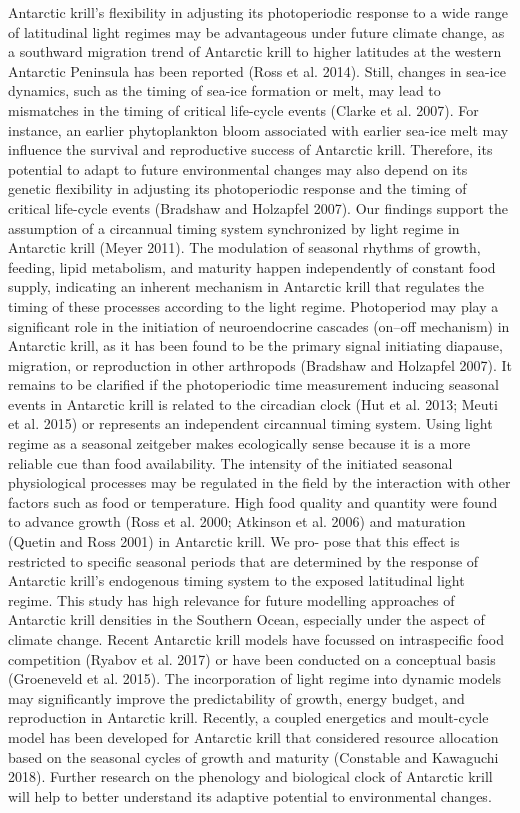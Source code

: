 Antarctic krill’s flexibility in adjusting its photoperiodic response to a wide range of latitudinal light regimes may be advantageous under future climate change, as a southward migration trend of Antarctic krill to higher latitudes at the western Antarctic Peninsula has been reported (Ross et al. 2014). Still, changes in sea-ice dynamics, such as the timing of sea-ice formation or melt, may lead to mismatches in the timing of critical life-cycle events (Clarke et al. 2007). For instance, an earlier phytoplankton bloom associated with earlier sea-ice melt may influence the survival and reproductive success of Antarctic krill. Therefore, its potential to adapt to future environmental changes may also depend on its genetic flexibility in adjusting its photoperiodic response and the timing of critical life-cycle events (Bradshaw and Holzapfel 2007). 
Our findings support the assumption of a circannual timing system synchronized by light regime in Antarctic krill (Meyer 2011). The modulation of seasonal rhythms of growth, feeding, lipid metabolism, and maturity happen independently of constant food supply, indicating an inherent mechanism in Antarctic krill that regulates the timing of these processes according to the light regime. Photoperiod may play a significant role in the initiation of neuroendocrine cascades (on–off mechanism) in Antarctic krill, as it has been found to be the primary signal initiating diapause, migration, or reproduction in other arthropods (Bradshaw and Holzapfel 2007). It remains to be clarified if the photoperiodic time measurement inducing seasonal events in Antarctic krill is related to the circadian clock (Hut et al. 2013; Meuti et al. 2015) or represents an independent circannual timing system. Using light regime as a seasonal zeitgeber makes ecologically sense because it is a more reliable cue than food availability. The intensity of the initiated seasonal physiological processes may be regulated in the field by the interaction with other factors such as food or temperature. High food quality and quantity were found to advance growth (Ross et al. 2000; Atkinson et al. 2006) and maturation (Quetin and Ross 2001) in Antarctic krill. We pro- pose that this effect is restricted to specific seasonal periods that are determined by the response of Antarctic krill’s endogenous timing system to the exposed latitudinal light regime. 
This study has high relevance for future modelling approaches of Antarctic krill densities in the Southern Ocean, especially under the aspect of climate change. Recent Antarctic krill models have focussed on intraspecific food competition (Ryabov et al. 2017) or have been conducted on a conceptual basis (Groeneveld et al. 2015). The incorporation of light regime into dynamic models may significantly improve the predictability of growth, energy budget, and reproduction in Antarctic krill. Recently, a coupled energetics and moult-cycle model has been developed for Antarctic krill that considered resource allocation based on the seasonal cycles of growth and maturity (Constable and Kawaguchi 2018). Further research on the phenology and biological clock of Antarctic krill will help to better understand its adaptive potential to environmental changes. 

